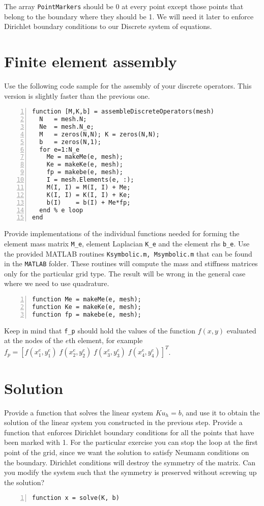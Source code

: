 \documentclass[unicode,11pt,a4paper,oneside,numbers=endperiod,openany]{scrartcl}
\begin{document}
The array \lstinline+PointMarkers+ should be 0 at every point except those points that belong to the boundary where they should be 1. We will 
need it later to enforce Dirichlet boundary conditions to our Discrete system of equations.


\section{Finite element assembly}
Use the following code sample for the assembly of your discrete operators. This version
is slightly faster than the previous one.
\begin{lstlisting}[numbers=left, numberstyle=\tiny, stepnumber=1, numbersep=10pt]
function [M,K,b] = assembleDiscreteOperators(mesh)
  N   = mesh.N;
  Ne  = mesh.N_e;
  M   = zeros(N,N); K = zeros(N,N);
  b   = zeros(N,1);
  for e=1:N_e
    Me = makeMe(e, mesh);
    Ke = makeKe(e, mesh);
    fp = makebe(e, mesh);
    I = mesh.Elements(e, :);
    M(I, I) = M(I, I) + Me;
    K(I, I) = K(I, I) + Ke;
    b(I)    = b(I) + Me*fp;
  end % e loop
end
\end{lstlisting}
Provide implementations of the individual 
functions needed for forming the element mass matrix \lstinline+M_e+, element Laplacian \lstinline+K_e+ 
and the element rhs \lstinline+b_e+. Use the provided MATLAB routines \lstinline+Ksymbolic.m, Msymbolic.m+ that can be found in the \lstinline+MATLAB+ folder. 
These routines will compute the mass and stiffness matrices only for the particular grid type. The result will be wrong in the general case where we need to use quadrature.
\begin{lstlisting}[numbers=left, numberstyle=\tiny, stepnumber=1, numbersep=10pt, identifierstyle=\ttfamily\color{Red}\bfseries] 
function Me = makeMe(e, mesh);
function Ke = makeKe(e, mesh);
function fp = makebe(e, mesh);
\end{lstlisting}
Keep in mind that \lstinline+f_p+ should hold the values of the function $f(x,y)$
evaluated at the nodes of the $e$th element,  for example
$f_p = \left [ f(x^e_1, y^e_1) \; f(x^e_2, y^e_2) \; f(x^e_3, y^e_3)  \; f(x^e_4, y^e_4)\right ]^T$.


\section{Solution}
Provide a function that solves the linear system $K u_h = b$, and use it to obtain the solution of the linear system
you constructed in the previous step. Provide a function that enforces Dirichlet boundary conditions for all the points that have been marked with 1. For the particular exercise you can stop the loop at the first point of the grid, since we want the solution to satisfy Neumann conditions on the boundary. Dirichlet conditions will destroy the symmetry of the matrix. Can you modify the system such that the symmetry is preserved without screwing up the solution?  
\begin{lstlisting}[numbers=left, numberstyle=\tiny, stepnumber=1, numbersep=10pt, identifierstyle=\ttfamily\color{Red}\bfseries] 
function x = solve(K, b)
\end{lstlisting}
\end{document}
